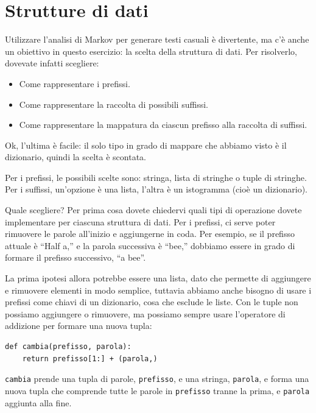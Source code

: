 \documentclass[10pt]{book}
\begin{document}
\section{Strutture di dati}

Utilizzare l'analisi di Markov per generare testi casuali è divertente, ma c'è anche un obiettivo in questo esercizio: la scelta della struttura di dati. Per risolverlo, dovevate infatti scegliere:

\begin{itemize}

\item Come rappresentare i prefissi.

\item Come rappresentare la raccolta di possibili suffissi.

\item Come rappresentare la mappatura da ciascun prefisso alla raccolta di suffissi.

\end{itemize}

Ok, l'ultima è facile: il solo tipo in grado di mappare che abbiamo visto è il dizionario, quindi la scelta è scontata.

Per i prefissi, le possibili scelte sono: stringa, lista di stringhe o tuple di stringhe. Per i suffissi, un'opzione è una lista, l'altra è un istogramma (cioè un dizionario).

Quale scegliere? Per prima cosa dovete chiedervi quali tipi di operazione dovete implementare per ciascuna struttura di dati. Per i prefissi, ci serve poter rimuovere le parole all'inizio e aggiungerne in coda. Per esempio, se il prefisso attuale è ``Half a,'' e la parola successiva è ``bee,'' dobbiamo essere in grado di formare il prefisso successivo, ``a bee''.

La prima ipotesi allora potrebbe essere una lista, dato che permette di aggiungere e rimuovere elementi in modo semplice, tuttavia abbiamo anche bisogno di usare i prefissi come chiavi di un dizionario, cosa che esclude le liste. Con le tuple non possiamo aggiungere o rimuovere, ma possiamo sempre usare l'operatore di addizione per formare una nuova tupla:

\begin{verbatim}
def cambia(prefisso, parola):
    return prefisso[1:] + (parola,)
\end{verbatim}
%
{\tt cambia} prende una tupla di parole, {\tt prefisso}, e una stringa, 
{\tt parola}, e forma una nuova tupla che comprende tutte le parole
in {\tt prefisso} tranne la prima, e {\tt parola} aggiunta alla fine.
\end{document}
